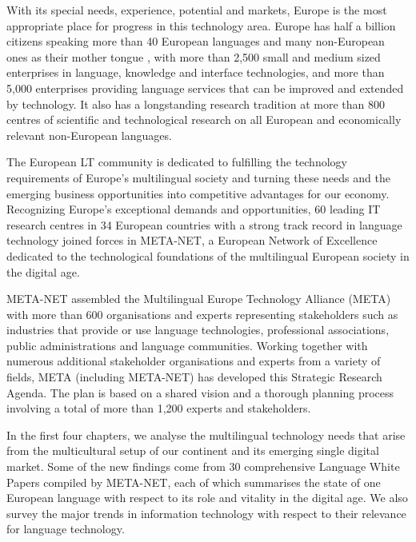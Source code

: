 \documentclass[10pt, plain]{../../metanetpaper}
\begin{document}
\begin{multicols}{2}
With its special needs, experience, potential and markets, Europe is the most appropriate place for progress in this technology area. Europe has half a billion citizens speaking more than 40 European languages and many non-European ones as their mother tongue \cite{eurobarometer2012}, with more than 2,500 small and medium sized enterprises in language, knowledge and interface technologies, and more than 5,000 enterprises providing language services that can be improved and extended by technology. It also has a longstanding research tradition at more than 800 centres of scientific and technological research on all European and economically relevant non-European languages. 

The European LT community is dedicated to fulfilling the technology requirements of Europe’s multilingual society and turning these needs and the emerging business opportunities into competitive advantages for our economy. Recognizing Europe’s exceptional demands and opportunities, 60 leading IT research centres in 34 European countries with a strong track record in language technology joined forces in META-NET, a European Network of Excellence dedicated to the technological foundations of the multilingual European society in the digital age. 

META-NET assembled the Multilingual Europe Technology Alliance (META) with more than 600 organisations and experts representing stakeholders such as industries that provide or use language technologies, professional associations, public administrations and language communities. Working together with numerous additional stakeholder organisations and experts from a variety of fields, META (including META-NET) has developed this Strategic Research Agenda. The plan is based on a shared vision and a thorough planning process involving a total of more than 1,200 experts and stakeholders. 

In the ﬁrst four chapters, we analyse the multilingual technology needs that arise from the multicultural setup of our continent and its emerging single digital market. Some of the new findings come from 30 comprehensive Language White Papers compiled by META-NET, each of which summarises the state of one European language with respect to its role and vitality in the digital age. We also survey the major trends in information technology with respect to their relevance for language technology. 


\end{multicols}
\end{document}
